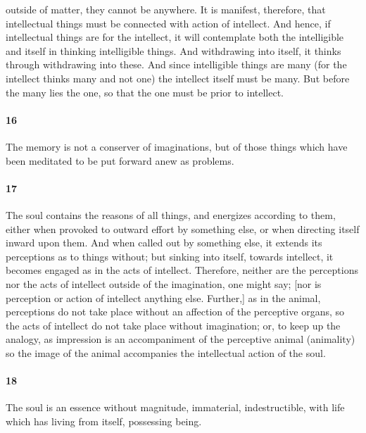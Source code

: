 \documentclass[12pt]{article}
\begin{document}
outside of matter, they cannot be anywhere. It is manifest, therefore, that intellectual things must be connected with action of intellect. And hence, if intellectual things are for the intellect, it will contemplate both the intelligible and itself in thinking intelligible things. And withdrawing into itself, it thinks through withdrawing into these. And since intelligible things are many (for the intellect thinks many and not one) the intellect itself must be many. But before the many lies the one, so that the one must be prior to intellect.

\paragraph{16} The memory is not a conserver of imaginations, but of those things which have been meditated to be put forward anew as problems.

\paragraph{17} The soul contains the reasons of all things, and energizes according to them, either when provoked to outward effort by something else, or when directing itself inward upon them. And when called out by something else, it extends its perceptions as to things without; but sinking into itself, towards intellect, it becomes engaged as in the acts of intellect. Therefore, neither are the perceptions nor the acts of intellect outside of the imagination, one might say; [nor is perception or action of intellect anything else. Further,] as in the animal, perceptions do not take place without an affection of the perceptive organs, so the acts of intellect do not take place without imagination; or, to keep up the analogy, as impression is an accompaniment of the perceptive animal (animality) so the image of the animal accompanies the intellectual action of the soul.

\paragraph{18} The soul is an essence without magnitude, immaterial, indestructible, with life which has living from itself, possessing being.
\end{document}

